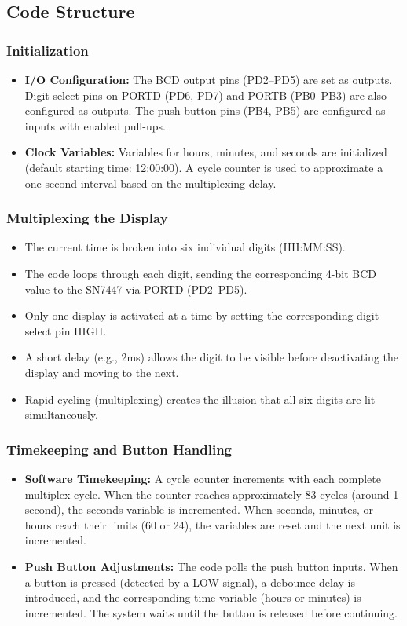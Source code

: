 \documentclass[12pt]{article}
\begin{document}
\subsection{Code Structure}
\subsubsection{Initialization}
\begin{itemize}
    \item \textbf{I/O Configuration:}  
    The BCD output pins (PD2–PD5) are set as outputs. Digit select pins on PORTD (PD6, PD7) and PORTB (PB0--PB3) are also configured as outputs. The push button pins (PB4, PB5) are configured as inputs with enabled pull-ups.
    \item \textbf{Clock Variables:}  
    Variables for hours, minutes, and seconds are initialized (default starting time: 12:00:00). A cycle counter is used to approximate a one-second interval based on the multiplexing delay.
\end{itemize}

\subsubsection{Multiplexing the Display}
\begin{itemize}
    \item The current time is broken into six individual digits (HH:MM:SS).
    \item The code loops through each digit, sending the corresponding 4-bit BCD value to the SN7447 via PORTD (PD2--PD5).
    \item Only one display is activated at a time by setting the corresponding digit select pin HIGH.
    \item A short delay (e.g., 2ms) allows the digit to be visible before deactivating the display and moving to the next.
    \item Rapid cycling (multiplexing) creates the illusion that all six digits are lit simultaneously.
\end{itemize}

\subsubsection{Timekeeping and Button Handling}
\begin{itemize}
    \item \textbf{Software Timekeeping:}  
    A cycle counter increments with each complete multiplex cycle. When the counter reaches approximately 83 cycles (around 1 second), the seconds variable is incremented. When seconds, minutes, or hours reach their limits (60 or 24), the variables are reset and the next unit is incremented.
    \item \textbf{Push Button Adjustments:}  
    The code polls the push button inputs. When a button is pressed (detected by a LOW signal), a debounce delay is introduced, and the corresponding time variable (hours or minutes) is incremented. The system waits until the button is released before continuing.
\end{itemize}
\end{document}
